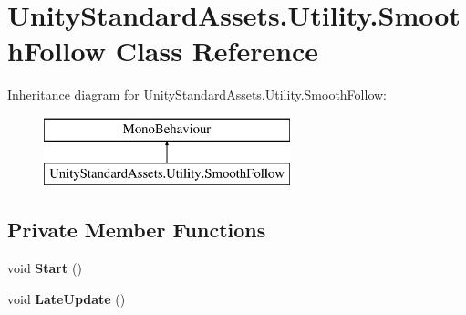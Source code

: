 \hypertarget{class_unity_standard_assets_1_1_utility_1_1_smooth_follow}{}\section{Unity\+Standard\+Assets.\+Utility.\+Smooth\+Follow Class Reference}
\label{class_unity_standard_assets_1_1_utility_1_1_smooth_follow}
Inheritance diagram for Unity\+Standard\+Assets.\+Utility.\+Smooth\+Follow\+:\begin{figure}[H]
\begin{center}
\leavevmode
\includegraphics[height=2.000000cm]{class_unity_standard_assets_1_1_utility_1_1_smooth_follow}
\end{center}
\end{figure}
\subsection*{Private Member Functions}
\begin{DoxyCompactItemize}
\item 
\mbox{\label{class_unity_standard_assets_1_1_utility_1_1_smooth_follow_a949f6bac40f089c249a7b9bfb3103b74}} 
void {\bfseries Start} ()
\item 
\mbox{\label{class_unity_standard_assets_1_1_utility_1_1_smooth_follow_af7192ff7aa1f41e9b7f92fa37259f402}} 
void {\bfseries Late\+Update} ()
\end{DoxyCompactItemize}
